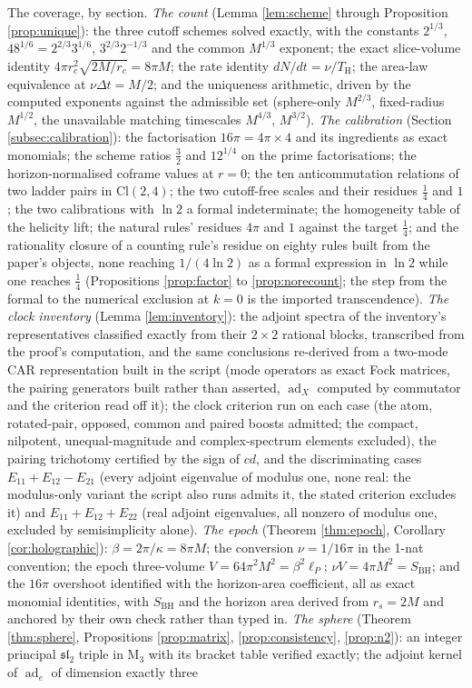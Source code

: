 \documentclass[11pt]{article}
\theoremstyle{definition}
\newcommand{\Cl}{\mathrm{Cl}}
\newcommand{\Mat}{\mathrm{M}}
\renewcommand{\TH}{T_{\mathrm{H}}} %
\newcommand{\lP}{\ell_{P}}
\newcommand{\SBH}{S_{\mathrm{BH}}}
\begin{document}
The coverage, by section. \emph{The count} (Lemma \ref{lem:scheme} through Proposition \ref{prop:unique}): the three cutoff schemes solved exactly, with the constants $2^{1/3}$, $48^{1/6} = 2^{2/3}3^{1/6}$, $3^{2/3}2^{-1/3}$ and the common $M^{1/3}$ exponent; the exact slice-volume identity $4\pi r_c^2\sqrt{2M/r_c} = 8\pi M$; the rate identity $dN/dt = \nu/\TH$; the area-law equivalence at $\nu\Delta t = M/2$; and the uniqueness arithmetic, driven by the computed exponents against the admissible set (sphere-only $M^{2/3}$, fixed-radius $M^{1/2}$, the unavailable matching timescales $M^{4/3}$, $M^{3/2}$). \emph{The calibration} (Section \ref{subsec:calibration}): the factorisation $16\pi = 4\pi \times 4$ and its ingredients as exact monomials; the scheme ratios $\tfrac32$ and $12^{1/4}$ on the prime factorisations; the horizon-normalised coframe values at $r = 0$; the ten anticommutation relations of two ladder pairs in $\Cl(2,4)$; the two cutoff-free scales and their residues $\tfrac14$ and $1$; the two calibrations with $\ln 2$ a formal indeterminate; the homogeneity table of the helicity lift; the natural rules' residues $4\pi$ and $1$ against the target $\tfrac14$; and the rationality closure of a counting rule's residue on eighty rules built from the paper's objects, none reaching $1/(4\ln 2)$ as a formal expression in $\ln 2$ while one reaches $\tfrac14$ (Propositions \ref{prop:factor} to \ref{prop:norecount}; the step from the formal to the numerical exclusion at $k = 0$ is the imported transcendence). \emph{The clock inventory} (Lemma \ref{lem:inventory}): the adjoint spectra of the inventory's representatives classified exactly from their $2\times2$ rational blocks, transcribed from the proof's computation, and the same conclusions re-derived from a two-mode CAR representation built in the script (mode operators as exact Fock matrices, the pairing generators built rather than asserted, $\operatorname{ad}_X$ computed by commutator and the criterion read off it); the clock criterion run on each case (the atom, rotated-pair, opposed, common and paired boosts admitted; the compact, nilpotent, unequal-magnitude and complex-spectrum elements excluded), the pairing trichotomy certified by the sign of $cd$, and the discriminating cases $E_{11} + E_{12} - E_{21}$ (every adjoint eigenvalue of modulus one, none real: the modulus-only variant the script also runs admits it, the stated criterion excludes it) and $E_{11} + E_{12} + E_{22}$ (real adjoint eigenvalues, all nonzero of modulus one, excluded by semisimplicity alone). \emph{The epoch} (Theorem \ref{thm:epoch}, Corollary \ref{cor:holographic}): $\beta = 2\pi/\kappa = 8\pi M$; the conversion $\nu = 1/16\pi$ in the 1-nat convention; the epoch three-volume $V = 64\pi^2M^2 = \beta^2\lP$; $\nu V = 4\pi M^2 = \SBH$; and the $16\pi$ overshoot identified with the horizon-area coefficient, all as exact monomial identities, with $\SBH$ and the horizon area derived from $r_s = 2M$ and anchored by their own check rather than typed in. \emph{The sphere} (Theorem \ref{thm:sphere}, Propositions \ref{prop:matrix}, \ref{prop:consistency}, \ref{prop:n2}): an integer principal $\mathfrak{sl}_2$ triple in $\Mat_3$ with its bracket table verified exactly; the adjoint kernel of $\operatorname{ad}_e$ of dimension exactly three 
\end{document}

